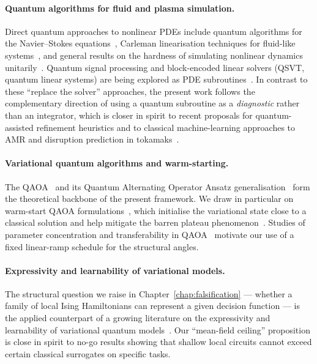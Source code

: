 \documentclass[12pt, a4paper, oneside]{report}
\begin{document}
\paragraph{Quantum algorithms for fluid and plasma simulation.}
Direct quantum approaches to nonlinear PDEs include quantum algorithms for the Navier--Stokes equations~\cite{gaitan2020}, Carleman linearisation techniques for fluid-like systems~\cite{liu2021carleman}, and general results on the hardness of simulating nonlinear dynamics unitarily~\cite{childs2020pde,dodin2021}. Quantum signal processing and block-encoded linear solvers (QSVT, quantum linear systems) are being explored as PDE subroutines~\cite{martyn2021qsvt}. In contrast to these ``replace the solver'' approaches, the present work follows the complementary direction of using a quantum subroutine as a \emph{diagnostic} rather than an integrator, which is closer in spirit to recent proposals for quantum-assisted refinement heuristics and to classical machine-learning approaches to AMR and disruption prediction in tokamaks~\cite{katesharbeck2019}.

\paragraph{Variational quantum algorithms and warm-starting.}
The QAOA~\cite{farhi2014} and its Quantum Alternating Operator Ansatz generalisation~\cite{hadfield2019} form the theoretical backbone of the present framework. We draw in particular on warm-start QAOA formulations~\cite{egger2021warmstart}, which initialise the variational state close to a classical solution and help mitigate the barren plateau phenomenon~\cite{mcclean2018,cerezo2021cost}. Studies of parameter concentration and transferability in QAOA~\cite{zhou2020qaoa,wang2018qaoa} motivate our use of a fixed linear-ramp schedule for the structural angles.

\paragraph{Expressivity and learnability of variational models.}
The structural question we raise in Chapter~\ref{chap:falsification} --- whether a family of local Ising Hamiltonians can represent a given decision function --- is the applied counterpart of a growing literature on the expressivity and learnability of variational quantum models~\cite{schuld2021effect,cerezo2022vqa,du2022learnability}. Our ``mean-field ceiling'' proposition is close in spirit to no-go results showing that shallow local circuits cannot exceed certain classical surrogates on specific tasks.
\end{document}
